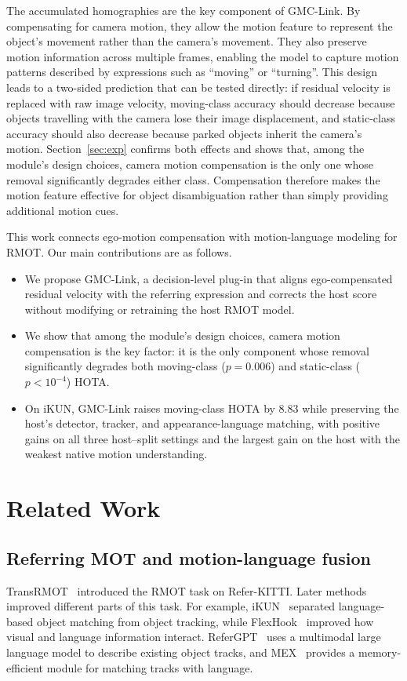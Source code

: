 \documentclass[sigconf,anonymous,nonacm]{acmart}
\begin{document}
The accumulated homographies are the key component of GMC-Link. By compensating for camera motion, they allow the motion feature to represent the object's movement rather than the camera's movement. They also preserve motion information across multiple frames, enabling the model to capture motion patterns described by expressions such as ``moving'' or ``turning''. This design leads to a two-sided prediction that can be tested directly: if residual velocity is replaced with raw image velocity, moving-class accuracy should decrease because objects travelling with the camera lose their image displacement, and static-class accuracy should also decrease because parked objects inherit the camera's motion. Section~\ref{sec:exp} confirms both effects and shows that, among the module's design choices, camera motion compensation is the only one whose removal significantly degrades either class. Compensation therefore makes the motion feature effective for object disambiguation rather than simply providing additional motion cues.

This work connects ego-motion compensation with motion-language modeling for RMOT. Our main contributions are as follows.
\begin{itemize}
  \item We propose GMC-Link, a decision-level plug-in that aligns ego-compensated residual velocity with the referring expression and corrects the host score without modifying or retraining the host RMOT model.
  \item We show that among the module's design choices, camera motion compensation is the key factor: it is the only component whose removal significantly degrades both moving-class ($p{=}0.006$) and static-class ($p{<}10^{-4}$) HOTA.
  \item On iKUN, GMC-Link raises moving-class HOTA by $8.83$ while preserving the host's detector, tracker, and appearance-language matching, with positive gains on all three host--split settings and the largest gain on the host with the weakest native motion understanding.
\end{itemize}

\section{Related Work}
\label{sec:related}

\subsection{Referring MOT and motion-language fusion}
TransRMOT~\cite{transrmot} introduced the RMOT task on Refer-KITTI. Later methods improved different parts of this task. For example, iKUN~\cite{ikun} separated language-based object matching from object tracking, while FlexHook~\cite{flexhook} improved how visual and language information interact. ReferGPT~\cite{refergpt} uses a multimodal large language model to describe existing object tracks, and MEX~\cite{mex} provides a memory-efficient module for matching tracks with language.
\end{document}
